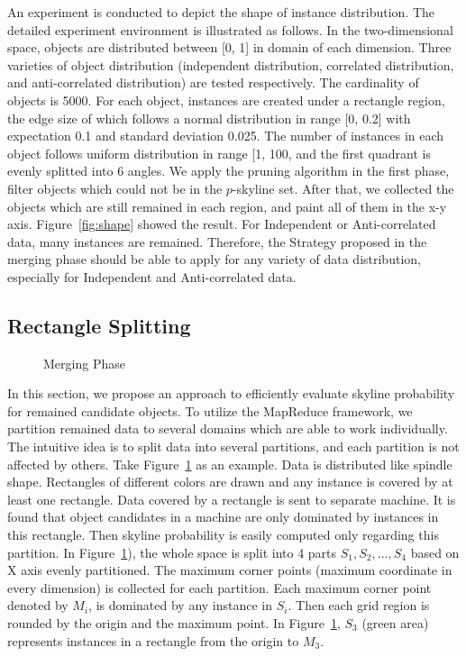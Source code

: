 An experiment is conducted to depict the shape of instance distribution. The detailed experiment environment is illustrated as follows. In the two-dimensional space, objects are distributed between [0, 1] in domain of each dimension. Three varieties of object distribution (independent distribution, correlated distribution, and anti-correlated distribution) are tested respectively. The cardinality of objects is 5000. For each object, instances are created under a rectangle region, the edge size of which follows a normal distribution in range [0, 0.2] with expectation 0.1 and standard deviation 0.025.
The number of instances in each object follows uniform distribution in range [1, 100, and the first quadrant is evenly splitted into 6 angles. We apply the pruning algorithm in the first phase, filter objects which could not be in the $p$-skyline set. After that, we collected the objects which are still remained in each region, and paint all of them in the x-y axis. Figure~\ref{fig:shape} showed the result. For Independent or Anti-correlated data, many instances are remained. Therefore, the Strategy proposed in the merging phase should be able to apply for any variety of data distribution, especially for Independent and Anti-correlated data.

\subsection{Rectangle Splitting}
\begin{figure}[t]
\vspace{-15pt}
\centering
  \centerline{}
  \caption{Merging Phase}
  \vspace{-15pt}
  \label{figure:gridMerge}
\end{figure}

In this section, we propose an approach to efficiently evaluate skyline probability for  remained candidate objects. To utilize the MapReduce framework, we partition remained data to several domains which are able to work individually. The intuitive idea is to split data into several partitions, and each partition is not affected by others. Take Figure~\ref{figure:gridMerge} as an example. Data is distributed like spindle shape. Rectangles of different colors are drawn and any instance is covered by at least one rectangle. Data covered by a rectangle is sent to separate machine. It is found that object candidates in a machine are only dominated by instances in this rectangle. Then skyline probability is easily computed only regarding this partition. In Figure~\ref{figure:gridMerge}), the whole space is split into 4 parts $S_1, S_2, \dots, S_4$ based on X axis evenly partitioned. The maximum corner points (maximum coordinate in every dimension) is collected for each partition. Each maximum corner point denoted by $M_i$, is dominated by any instance in $S_i$. Then each grid region is rounded by the origin and the maximum point. In Figure~\ref{figure:gridMerge}, $S_3$ (green area) represents instances in a rectangle from the origin to $M_3$.

